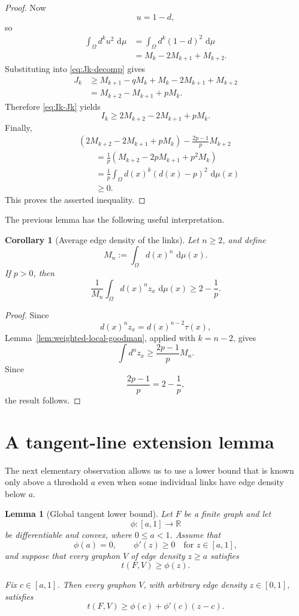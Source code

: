 \documentclass[11pt]{article}
\newtheorem{lemma}[theorem]{Lemma}
\newtheorem{corollary}[theorem]{Corollary}
\newcommand{\R}{\mathbb{R}}
\newcommand{\1}{\mathbf{1}}
\newcommand{\dd}{\,\mathrm{d}}
\begin{document}
\begin{proof}
Now
\[
u=1-d,
\]
so
\begin{align*}
\int_\Omega d^ku^2\,\dd\mu
&=
\int_\Omega d^k(1-d)^2\,\dd\mu
\\
&=
M_k-2M_{k+1}+M_{k+2}.
\end{align*}
Substituting into \eqref{eq:Jk-decomp} gives
\begin{align*}
J_k
&\ge
M_{k+1}-qM_k
+
M_k-2M_{k+1}+M_{k+2}
\\
&=
M_{k+2}-M_{k+1}+pM_k.
\end{align*}
Therefore \eqref{eq:Ik-Jk} yields
\[
I_k
\ge
2M_{k+2}-2M_{k+1}+pM_k.
\]
Finally,
\begin{align*}
&\left(
2M_{k+2}-2M_{k+1}+pM_k
\right)
-
\frac{2p-1}{p}M_{k+2}
\\
&\qquad=
\frac1p
\left(
M_{k+2}-2pM_{k+1}+p^2M_k
\right)
\\
&\qquad=
\frac1p
\int_\Omega
d(x)^k(d(x)-p)^2\,\dd\mu(x)
\\
&\qquad\ge0.
\end{align*}
This proves the asserted inequality.
\end{proof}

The previous lemma has the following useful interpretation.

\begin{corollary}[Average edge density of the links]
\label{cor:link-average}
Let $n\ge2$, and define
\[
M_n:=\int_\Omega d(x)^n\,\dd\mu(x).
\]
If $p>0$, then
\[
\frac{1}{M_n}
\int_\Omega d(x)^n z_x\,\dd\mu(x)
\ge
2-\frac1p.
\]
\end{corollary}

\begin{proof}
Since
\[
d(x)^nz_x=d(x)^{n-2}\tau(x),
\]
Lemma~\ref{lem:weighted-local-goodman}, applied with $k=n-2$,
gives
\[
\int d^nz_x
\ge
\frac{2p-1}{p}M_n.
\]
Since
\[
\frac{2p-1}{p}
=
2-\frac1p,
\]
the result follows.
\end{proof}


\section{A tangent-line extension lemma}

The next elementary observation allows us to use a lower bound that is
known only above a threshold $a$ even when some individual links have
edge density below $a$.

\begin{lemma}[Global tangent lower bound]
\label{lem:tangent}
Let $F$ be a finite graph and let
\[
\phi:[a,1]\to\R
\]
be differentiable and convex, where $0\le a<1$.  Assume that
\[
\phi(a)=0,
\qquad
\phi'(z)\ge0
\quad\text{for }z\in[a,1],
\]
and suppose that every graphon $V$ of edge density $z\ge a$ satisfies
\[
t(F,V)\ge\phi(z).
\]

Fix $c\in[a,1]$.  Then every graphon $V$, with arbitrary edge density
$z\in[0,1]$, satisfies
\[
\boxed{
t(F,V)
\ge
\phi(c)+\phi'(c)(z-c).
}
\]
\end{lemma}
\end{document}
